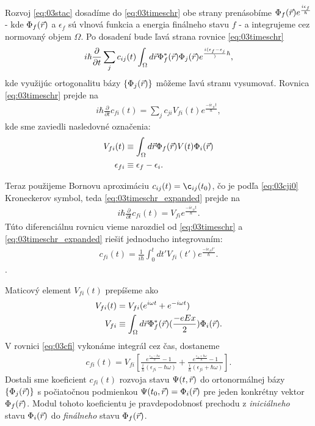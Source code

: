 Rozvoj \eqref{eq:03stac} dosadíme do \eqref{eq:03timeschr} obe strany prenásobíme $\Phi_f(\vec{r})e^{\frac{i\epsilon_f}{\hbar}}$ - kde $\Phi_f(\vec{r})$ a $\epsilon_f$ sú vlnová funkcia a energia finálneho stavu $f$ - a integrujeme cez normovaný objem $\Omega$. Po dosadení bude ľavá strana rovnice \eqref{eq:03timeschr} 
\begin{align}
i\hbar\frac{\partial}{\partial t} \sum_j c_{ij}(t)\int_{\Omega} d\vec{r} \Phi_f^{*}(\vec{r})\Phi_j(\vec{r})e^{\frac{i(\epsilon_f-\epsilon_j}){\hbar}} \text{,}
\end{align}
kde využijúc ortogonalitu bázy $\{\Phi_j(\vec{r})\}$ môžeme ľavú stranu vysumovať. Rovnica \eqref{eq:03timeschr} prejde na 
\begin{align}
\label{eq:03timeschr_expanded}
i\hbar\frac{\partial}{\partial t}c_{fi}(t)=\sum_j c_{ji} V_{fi}(t)e^{\frac{-i \epsilon_{fi} t}{\hbar}} \mathrm{,}
\end{align}
kde sme zaviedli nasledovné označenia:
\begin{align}
V_{fi}(t) &\equiv \int_{\Omega}d\vec{r} \Phi_f(\vec{r})V(t)\Phi_i(\vec{r}) \\
\epsilon_{fi} &\equiv \epsilon_f - \epsilon_i \text{.}
\end{align}

Teraz použijeme Bornovu aproximáciu $c_{ij}(t)=\c_{ij}(t_0)$, čo je podľa \eqref{eq:03cji0} Kroneckerov symbol, teda \eqref{eq:03timeschr_expanded} prejde na
\begin{align}
\label{eq:03born_appr}
i\hbar\frac{\partial}{\partial t}c_{fi}(t)=V_{fi}e^{\frac{-i\epsilon_{fi} t}{\hbar}}\mathrm{.}
\end{align}
Túto diferenciálnu rovnicu vieme narozdiel od \eqref{eq:03timeschr} a \eqref{eq:03timeschr_expanded} riešiť jednoducho integrovaním:
\begin{align}
\label{eq:03cfi}
c_{fi}(t) = \frac{1}{i\hbar} \int_0^t dt' V_{fi}(t')e^{\frac{-i\epsilon_{fi} t'}{\hbar}} \text{.}
\end{align}.

Maticový element $V_{fi}(t)$ prepíšeme ako
\begin{align}
V_{fi}(t)&=V_{fi}(e^{i\omega t}+e^{-i\omega t})\\
\label{eq:03Vfi}
V_{fi}&\equiv \int_{\Omega} d\vec{r} \Phi_f^{*}(\vec{r})(\frac{-eEx}{2})\Phi_i(\vec{r}) \text{.}
\end{align}
V rovnici \eqref{eq:03cfi} vykonáme integrál cez čas, dostaneme
\begin{align}
\label{eq:03cfi_final}
c_{fi}(t)=V_{fi}[\frac{e^{\frac{\epsilon_{fi} - \hbar\omega}{\hbar}}-1}{\frac{i}{\hbar}(\epsilon_{fi}-\hbar\omega)}+\frac{e^{\frac{\epsilon_{fi} + \hbar\omega}{\hbar}}-1}{\frac{i}{\hbar}(\epsilon_{fi}+\hbar\omega)}] \text{.}
\end{align}
Dostali sme koeficient $c_{fi}(t)$ rozvoja  stavu $\Psi(t,\vec{r})$ do ortonormálnej bázy $\{\Phi_j(\vec{r})\}$ s počiatočnou podmienkou $\Psi(t_0,\vec{r})=\Phi_i(\vec{r})$ pre jeden konkrétny vektor $\Phi_f(\vec{r})$. Modul tohoto koeficientu je pravdepodobnosť prechodu z {\it iniciálneho} stavu $\Phi_i(\vec{r})$ do {\it finálneho} stavu $\Phi_f(\vec{r})$.

